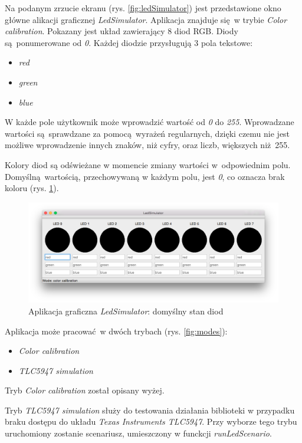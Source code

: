 \documentclass[eng,printmode]{mgr}
\begin{document}
Na podanym zrzucie ekranu (rys. \ref{fig:ledSimulator}) jest przedstawione okno główne alikacji graficznej \emph{LedSimulator}. Aplikacja znajduje się w trybie \emph{Color calibration}. Pokazany jest układ zawierający 8 diod RGB. Diody są ponumerowane od \emph{0}. Każdej diodzie przysługują 3 pola tekstowe:

\begin{itemize}
  \item{\emph{red}}
  \item{\emph{green}}
  \item{\emph{blue}}
\end{itemize}

W każde pole użytkownik może wprowadzić wartość od \emph{0} do \emph{255}. Wprowadzane wartości są sprawdzane za pomocą wyrażeń regularnych, dzięki czemu nie jest możliwe wprowadzenie innych znaków, niż cyfry, oraz liczb, większych niż 255.

Kolory diod są odświeżane w momencie zmiany wartości w odpowiednim polu. Domyślną wartością, przechowywaną w każdym polu, jest \emph{0}, co oznacza brak koloru (rys. \ref{fig:ledSimulator2}).

\begin{figure}[!ht]
    \centering
    \includegraphics[width=\textwidth]{Figures/ledSimulator2.png} 
    \caption{Aplikacja graficzna \emph{LedSimulator}: domyślny stan diod}
    \label{fig:ledSimulator2}
\end{figure}


Aplikacja może pracować w dwóch trybach (rys. \ref{fig:modes}):

\begin{itemize}
  \item{\emph{Color calibration}}
  \item{\emph{TLC5947 simulation}}
\end{itemize}

Tryb \emph{Color calibration} został opisany wyżej.

Tryb \emph{TLC5947 simulation} służy do testowania działania biblioteki w przypadku braku dostępu do układu \emph{Texas Instruments TLC5947}. Przy wyborze tego trybu uruchomiony zostanie scenariusz, umieszczony w funckcji \emph{runLedScenario}. 
\end{document}
